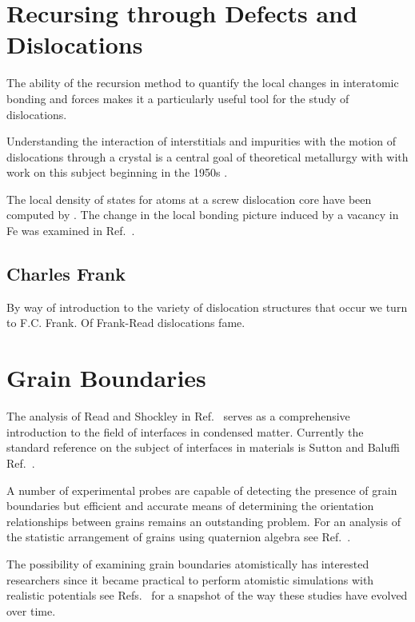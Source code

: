 \section{Recursing through Defects and Dislocations}
The ability of the recursion method to quantify the local changes in interatomic bonding and
forces makes it a particularly useful tool for the study of dislocations. 

Understanding the interaction of interstitials and impurities with the motion of
dislocations through a crystal is a central goal of theoretical metallurgy with
with work on this subject beginning in the 1950s \cite{cochardt55}.

The local density of states for atoms at a screw dislocation core have been computed by \cite{paidar81,masuda81}. 
The change in the local bonding picture induced by a vacancy in Fe was examined in Ref.~\cite{masuda82,ohta87}.

\subsection{Charles Frank}
By way of introduction to the variety of dislocation structures that occur
we turn to F.C. Frank. Of Frank-Read dislocations fame.

\section{Grain Boundaries}
The analysis of Read and Shockley in Ref.~\cite{read50} serves as a comprehensive
introduction to the field of interfaces in condensed matter. Currently the 
standard reference on the subject of interfaces in materials is Sutton and 
Baluffi Ref.~\cite{sutton95}.

A number of experimental probes are capable of detecting the presence of 
grain boundaries but efficient and accurate means of determining 
the orientation relationships between grains remains an outstanding problem.
For an analysis of the statistic arrangement of grains using quaternion
algebra see Ref.~\cite{sutton96}.

The possibility of examining grain boundaries atomistically has interested
researchers since it became practical to perform atomistic simulations
with realistic potentials see Refs.~\cite{bristowe75,wolf83,paxton87,paxton88,paxtonsutton88,
kohyama88,kohyama94,paxton96,rittner96,tschopp07,momida13,du11,du12,mceniry18} for a
snapshot of the way these studies have evolved over time.

